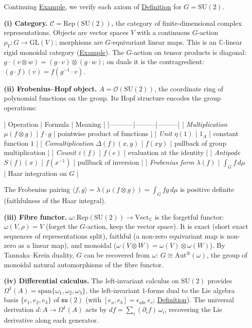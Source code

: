 \begin{example}
  \label{ex:quantum-universe-su2}
Continuing \hyperref[ex:rigid-monoidal-vect]{Example}, we verify each axiom
of \hyperref[def:quantum-universe]{Definition} for $G = \mathrm{SU}(2)$.

\textbf{(i) Category.}
$\mathcal{C} = \mathrm{Rep}(\mathrm{SU}(2))$, the category of
finite-dimensional complex representations. Objects are vector spaces
$V$ with a continuous $G$-action $\rho_V \colon G \to \mathrm{GL}(V)$;
morphisms are $G$-equivariant linear maps. This is an
$\mathbb{C}$-linear rigid monoidal category
(\hyperref[ex:rigid-monoidal-vect]{Example}). The $G$-action on tensor
products is diagonal: $g \cdot (v \otimes w) = (g \cdot v) \otimes
(g \cdot w)$; on duals it is the contragredient:
$(g \cdot f)(v) = f(g^{-1} \cdot v)$.

\textbf{(ii) Frobenius--Hopf object.}
$A = \mathcal{O}(\mathrm{SU}(2))$, the coordinate ring of polynomial
functions on the group. Its Hopf structure encodes the group operations:

| Operation | Formula | Meaning |
|-----------|---------|---------|
| \emph{Multiplication} $\mu(f \otimes g)$ | $f \cdot g$ | pointwise product of functions |
| \emph{Unit} $\eta(1)$ | $1_A$ | constant function $1$ |
| \emph{Comultiplication} $\Delta(f)(x, y)$ | $f(xy)$ | pullback of group multiplication |
| \emph{Counit} $\varepsilon(f)$ | $f(e)$ | evaluation at the identity |
| \emph{Antipode} $S(f)(x)$ | $f(x^{-1})$ | pullback of inversion |
| \emph{Frobenius form} $\lambda(f)$ | $\int_G f\, d\mu$ | Haar integration on $G$ |

The Frobenius pairing
$\langle f, g \rangle = \lambda(\mu(f \otimes g)) = \int_G f g\, d\mu$
is positive definite (faithfulness of the Haar integral).

\textbf{(iii) Fibre functor.}
$\omega \colon \mathrm{Rep}(\mathrm{SU}(2)) \to
\mathrm{Vect}_{\mathbb{C}}$ is the forgetful functor: $\omega(V, \rho)
= V$ (forget the $G$-action, keep the vector space). It is exact
(short exact sequences of representations split), faithful (a non-zero
equivariant map is non-zero as a linear map), and monoidal
($\omega(V \otimes W) = \omega(V) \otimes \omega(W)$).
By Tannaka--Krein duality, $G$ can be recovered from $\omega$:
$G \cong \mathrm{Aut}^{\otimes}(\omega)$, the group of monoidal natural
automorphisms of the fibre functor.

\textbf{(iv) Differential calculus.}
The left-invariant calculus on $\mathrm{SU}(2)$ provides
$\Omega^1(A) = \mathrm{span}\{\omega_1, \omega_2, \omega_3\}$,
the left-invariant $1$-forms dual to the Lie algebra basis
$\{e_1, e_2, e_3\}$ of $\mathfrak{su}(2)$ (with
$[e_a, e_b] = \epsilon_{abc}\, e_c$;
\hyperref[def:su2-basis]{Definition}).
The universal derivation $d \colon A \to \Omega^1(A)$
acts by $df = \sum_i (\partial_i f)\, \omega_i$, recovering the
Lie derivative along each generator.
\end{example}

